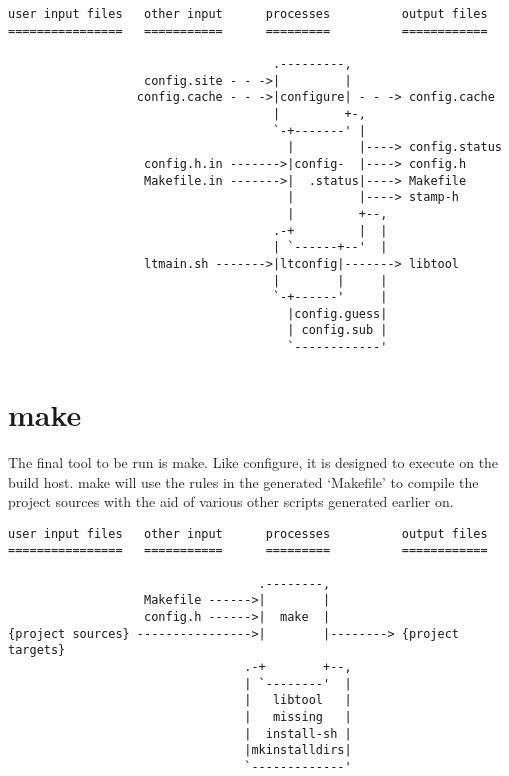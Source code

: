 \begin{verbatim}
user input files   other input      processes          output files
================   ===========      =========          ============

                                     .---------,
                   config.site - - ->|         |
                  config.cache - - ->|configure| - - -> config.cache
                                     |         +-,
                                     `-+-------' |
                                       |         |----> config.status
                   config.h.in ------->|config-  |----> config.h
                   Makefile.in ------->|  .status|----> Makefile
                                       |         |----> stamp-h
                                       |         +--,
                                     .-+         |  |
                                     | `------+--'  |
                   ltmain.sh ------->|ltconfig|-------> libtool
                                     |        |     |
                                     `-+------'     |
                                       |config.guess|
                                       | config.sub |
                                       `------------'

\end{verbatim}

\section{make}

The final tool to be run is make. Like configure, it is designed to execute on the build host. make will use the rules in the generated `Makefile' to compile the project sources with the aid of various other scripts generated earlier on.

 	
\newpage 	

\begin{verbatim}
user input files   other input      processes          output files
================   ===========      =========          ============

                                   .--------,
                   Makefile ------>|        |
                   config.h ------>|  make  |
{project sources} ---------------->|        |--------> {project targets}
                                 .-+        +--,
                                 | `--------'  |
                                 |   libtool   |
                                 |   missing   |
                                 |  install-sh |
                                 |mkinstalldirs|
                                 `-------------'

\end{verbatim}
